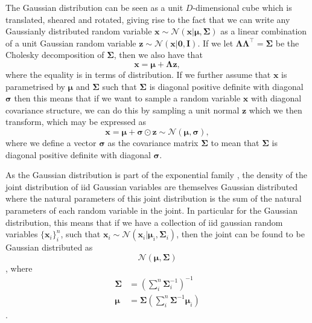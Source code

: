 The Gaussian distribution can be seen as a unit $D$-dimensional cube which is
translated, sheared and rotated, giving rise to the fact that we can write any
Gaussianly distributed random variable $\bm{x} \sim \mathcal{N}(\bm{x} |
\bm{\mu}, \bm{\Sigma})$ as a linear combination of a unit Gaussian random
variable $\bm{z} \sim \mathcal{N}(\bm{x} | \bm{0}, \bm{I})$. If
we let $\bm{\Lambda} \bm{\Lambda}^{\top} = \bm{\Sigma}$ be the Cholesky
decomposition\cite[p.~100-102]{Press:2007:NRE:1403886} of $\bm{\Sigma}$, then we
also have that
\begin{equation}
  \label{eq:sample_x}
  \bm{x} = \bm{\mu} + \bm{\Lambda}\bm{z},
\end{equation}
where the equality is in terms of distribution. If we further assume that
$\bm{x}$ is parametrised by $\bm{\mu}$ and $\bm{\Sigma}$ such that $\bm{\Sigma}$
is diagonal positive definite with diagonal $\bm{\sigma}$ then this means that if we want to
sample a random variable $\bm{x}$ with diagonal covariance structure, we
can do this by sampling a unit normal $\bm{z}$ which we then transform, which
may be expressed as
\begin{equation}
  \label{eq:sample_x_diag_covariance}
  \bm{x} = \bm{\mu} + \bm{\sigma} \odot \bm{z} \sim \mathcal{N}(\bm{\mu}, \bm{\sigma}),
\end{equation}
where we define a vector $\bm{\sigma}$ as the covariance matrix $\bm{\Sigma}$ to
mean that $\bm{\Sigma}$ is diagonal positive definite with diagonal $\bm{\sigma}$.

As the Gaussian distribution is part of the exponential
family \cite{Barber:2012:BRM:2207809}, the density of the joint distribution of iid
Gaussian variables are themselves Gaussian distributed where the natural
parameters of this joint distribution is the sum of the natural parameters of
each random variable in the joint. In particular for the Gaussian distribution,
this means that if we have a collection of iid gaussian random variables
$\{\bm{x}_i\}_i^n$, such that $\bm{x}_i \sim \mathcal{N}(\bm{x}_i | \bm{\mu}_i,
\bm{\Sigma}_{i})$, then the joint can be found to be Gaussian distributed as
\begin{equation*}
  \mathcal{N}(\bm{\mu}, \bm{\Sigma})
\end{equation*},
where
\begin{align}
  \bm{\Sigma} & = \left( \sum_i^n \bm{\Sigma}_i^{-1} \right)^{-1} \label{eq:joint_indep_normal_covariance}\\ 
  \bm{\mu} & = \bm{\Sigma}\left( \sum_i^n \bm{\Sigma}^{-1} \bm{\mu}_i \right) \label{eq:joint_indep_normal_mean}
\end{align}\cite[p.~78-84]{Bishop:2006}.

